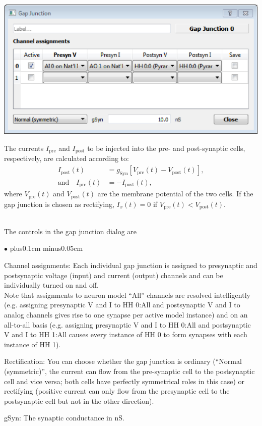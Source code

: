 \documentclass{article}
\newenvironment{myitem}{\begin{list}{$\bullet$}{\setlength{\leftmargin}{1.1em}
\itemsep0.1cm plus0.1cm minus0.05cm
\listparindent0cm
\addtolength{\labelsep}{0.5\labelsep}
\setlength{\labelwidth}{0.8em}
\setlength{\leftmargin}{\labelwidth}
\addtolength{\leftmargin}{\labelsep}
}}{\end{list}}
\begin{document}
\noindent
\parbox{0.4\textwidth}{
\includegraphics[scale=0.4]{gapJunctionDialog}
}
\hfill
\parbox{0.48\textwidth}{
The currents $I_{\text{pre}}$ and $I_{\text{post}}$ to be injected
into the pre- and post-synaptic cells, respectively, are calculated
according to:
\begin{align}
  I_{\text{post}}(t) &= g_{\text{Syn}} [V_{\text{pre}}(t) - V_{\text{post}}(t)],  \\
  \text{and} \quad I_{\text{pre}}(t) &= -I_{\text{post}}(t), 
\end{align}
where $V_{\text{pre}}(t)$ and $V_{\text{post}}(t)$ are the membrane
potential of the two cells. If the gap junction is chosen as
rectifying, $I_x (t)= 0$ if $V_{\text{pre}}(t) < V_{\text{post}}(t)$.
} \\[0.2cm]
The controls in the gap junction dialog are
\begin{myitem}
	\item Channel assignments: Each individual gap junction is assigned to presynaptic
	and postsynaptic voltage (input) and current (output) channels and can be individually
	turned on and off. \\
	Note that assignments to neuron model ``All'' channels are resolved intelligently
	(e.g. assigning presynaptic V and I to HH 0:All and postsynaptic V and I to analog channels
	gives rise to one synapse per active model instance)
	and on an all-to-all basis (e.g. assigning presynaptic V and I to HH 0:All and 
	postsynaptic V and I to HH 1:All causes every instance of HH 0 to form synapses with
	each instance of HH 1).
	\item Rectification: You can choose whether the gap junction is ordinary (``Normal (symmetric)'', the
	current can flow from the pre-synaptic cell to the postsynaptic cell
	and vice versa; both cells have perfectly symmetrical roles in this
	case) or rectifying (positive current can only flow from the presynaptic
	cell to the postsynaptic cell but not in the other direction).
	\item gSyn: The synaptic conductance in nS.
\end{myitem}
\end{document}
